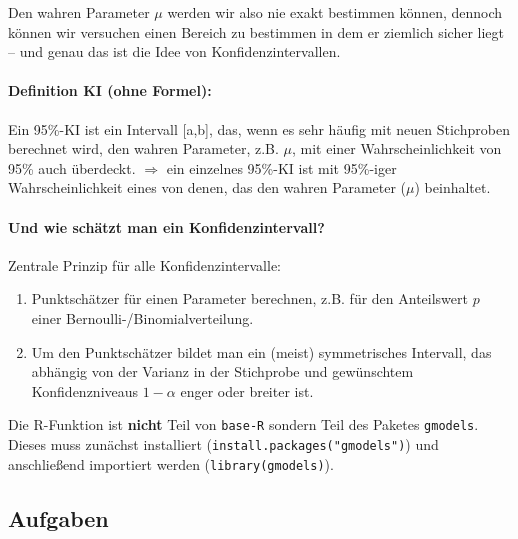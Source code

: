 \documentclass[a4paper]{article}
\newcommand\dangersign{%
 \makebox[1.8em][c]{%
 \makebox[0pt][c]{\raisebox{.15em}{\small!}}%
 \makebox[0pt][c]{\color{red}\Large$\triangle$}}}%
\begin{document}
\noindent Den wahren Parameter $\mu$ werden wir also nie exakt bestimmen können, dennoch können wir versuchen einen Bereich zu bestimmen in dem er ziemlich sicher liegt -- und genau das ist die Idee von Konfidenzintervallen.

\paragraph{Definition KI (ohne Formel):} Ein 95\%-KI ist ein Intervall [a,b], das, wenn es sehr häufig mit neuen Stichproben berechnet wird, den wahren Parameter, z.B. $\mu$, mit einer Wahrscheinlichkeit von 95\% auch überdeckt. $\Rightarrow$ ein einzelnes 95\%-KI ist mit 95\%-iger Wahrscheinlichkeit eines von denen, das den wahren Parameter ($\mu$) beinhaltet.

\paragraph{Und wie schätzt man ein Konfidenzintervall?} Zentrale Prinzip für alle Konfidenzintervalle:

\begin{enumerate}
    \item Punktschätzer für einen Parameter berechnen, z.B. für den Anteilswert $p$ einer Bernoulli-/Binomialverteilung.
    \item Um den Punktschätzer bildet man ein (meist) symmetrisches Intervall, das abhängig von der Varianz in der Stichprobe und gewünschtem Konfidenzniveaus $1-\alpha$ enger oder breiter ist.
\end{enumerate}

\noindent {}

\noindent \dangersign Die R-Funktion ist \textbf{nicht} Teil von \texttt{base-R} sondern Teil des Paketes \texttt{gmodels}. Dieses muss zunächst installiert (\texttt{install.packages("gmodels")}) und anschließend importiert werden (\texttt{library(gmodels)}).

\clearpage

\subsection{Aufgaben}
\end{document}
